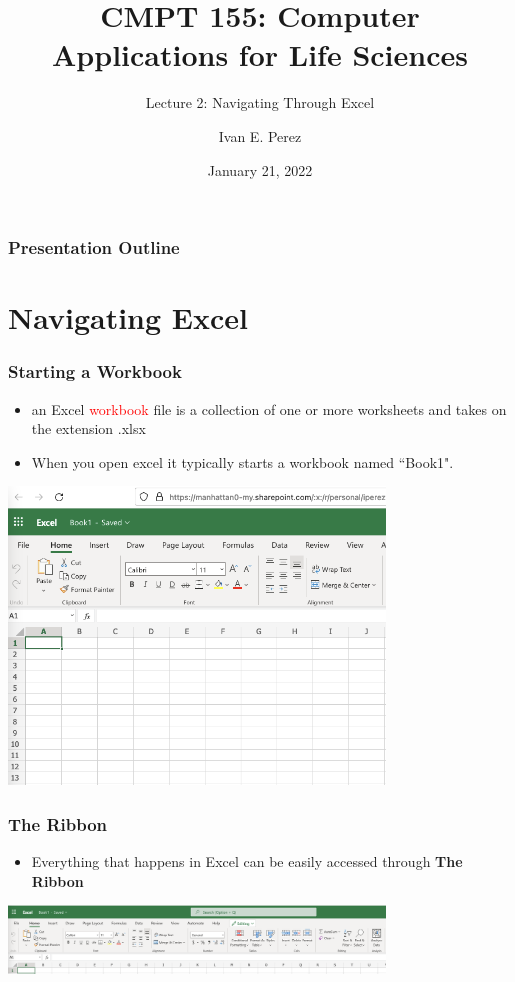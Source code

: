 \documentclass[12pt]{beamer}
\title{CMPT 155: Computer Applications for Life Sciences}
\subtitle{Lecture 2: Navigating Through Excel}
\author{Ivan E. Perez}
\institute{}
\date{January 21, 2022}
\begin{document}
	\begin{frame}
		\titlepage
	\end{frame}
	
	\begin{frame}
		\frametitle{Presentation Outline}
		\tableofcontents
		
	\end{frame}
	
	\section{Navigating Excel}
	
	\begin{frame}
		\frametitle{Starting a Workbook}
		\begin{itemize}
			\item an Excel \textcolor{red}{workbook} file is a collection of one or more worksheets and takes on the extension .xlsx
			\item When you open excel it typically starts a workbook named ``Book1".  
		\end{itemize} 
		\begin{center}
			\includegraphics[width=10cm]{Workbook.png}
		\end{center}
	\end{frame}
	
	\begin{frame}
		\frametitle{The Ribbon}
		\begin{itemize}
			\item Everything that happens in Excel can be easily accessed through \textbf{The Ribbon}			
		\end{itemize}
		\begin{center}
			\includegraphics[width=10cm]{Ribbon.png}
		\end{center}	
\end{frame}
	
\end{document}
